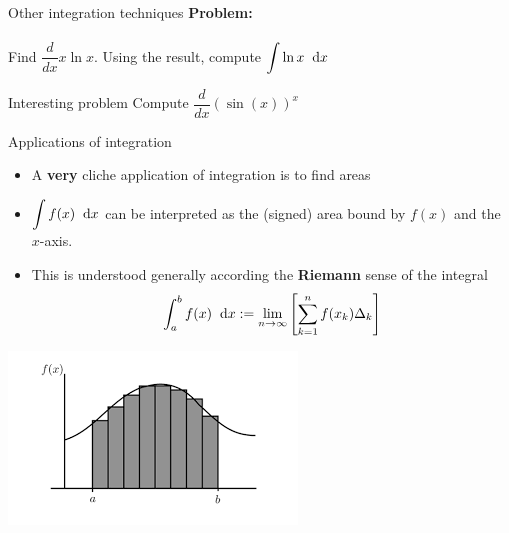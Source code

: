 \documentclass{beamer}
\renewcommand{\d}{\hspace{0.2cm}\text{d}}
\begin{document}
\begin{frame}{Other integration techniques}
    \textbf{Problem: }\\~\\
    Find $\dfrac{d}{dx} x\ln x$. Using the result, compute $\displaystyle\int \ln x \d x$
    \vspace{5cm}
\end{frame}

\begin{frame}{Interesting problem}
    Compute $\dfrac{d}{dx} (\sin(x))^x$
    \vspace{5cm}
\end{frame}

\begin{frame}{Applications of integration}
\begin{itemize}
	\item A \textbf{very} cliche application of integration is to find areas
	\item $\displaystyle \int f(x) \d x$ can be interpreted as the (signed) area bound by $f(x)$ and the $x$-axis.
	\item This is understood generally according the \textbf{Riemann} sense of the integral\\
	$$ \int_a^b f(x) \d x := \lim_{n\to\infty} \left[\sum_{k = 1}^n f(x_k) \Delta_k\right]$$
\end{itemize}
\end{frame}

\begin{frame}
\includegraphics[width=\linewidth]{img/riemann.png}
\end{frame}
\end{document}
